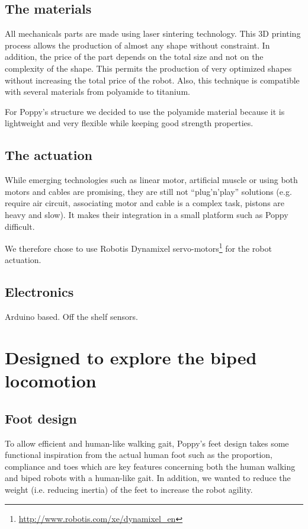 \subsection{The materials} %
All mechanicals parts are made using laser sintering technology.
This 3D printing process allows the production of almost any shape without constraint.
In addition, the price of the part depends on the total size and not on the complexity of the shape.
This permits the production of very optimized shapes without increasing the total price of the robot.
Also, this technique is compatible with several materials from polyamide to titanium.

For Poppy's structure we decided to use the polyamide material because it is lightweight and very flexible while keeping good strength properties.

\subsection{The actuation} %

While emerging technologies such as linear motor, artificial muscle or using both motors and cables are promising, they are still not ``plug'n'play'' solutions (e.g.
require air circuit, associating motor and cable is a complex task, pistons are heavy and slow).
It makes their integration in a small platform such as Poppy difficult.

We therefore chose to use Robotis Dynamixel servo-motors\footnote{\url{http://www.robotis.com/xe/dynamixel_en}} for the robot actuation.


\subsection{Electronics} %
Arduino based.
Off the shelf sensors.






\section{Designed to explore the biped locomotion}

\subsection{Foot design} %
To allow efficient and human-like walking gait, Poppy's feet design takes some functional inspiration from the actual human foot such as the proportion, compliance and toes which are key features concerning both the human walking and biped robots with a human-like gait.
In addition, we wanted to reduce the weight (i.e.
reducing inertia) of the feet to increase the robot agility.

